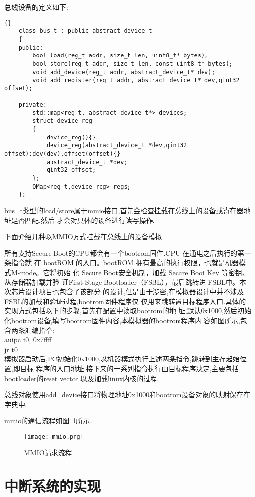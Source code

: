 总线设备的定义如下:
\begin{lstlisting}{}
    class bus_t : public abstract_device_t
    {
    public:
        bool load(reg_t addr, size_t len, uint8_t* bytes);
        bool store(reg_t addr, size_t len, const uint8_t* bytes);
        void add_device(reg_t addr, abstract_device_t* dev);
        void add_register(reg_t addr, abstract_device_t* dev,qint32 offset);
    
    private:
        std::map<reg_t, abstract_device_t*> devices;
        struct device_reg
        {
            device_reg(){}
            device_reg(abstract_device_t *dev,qint32 offset):dev(dev),offset(offset){}
            abstract_device_t *dev;
            qint32 offset;
        };
        QMap<reg_t,device_reg> regs;
    };     
\end{lstlisting}

bus\_t类型的load/store属于mmio接口,首先会检查挂载在总线上的设备或寄存器地址是否匹配,然后
才会对具体的设备进行读写操作.


下面介绍几种以MMIO方式挂载在总线上的设备模拟.


所有支持Secure Boot的CPU都会有一个bootrom固件.CPU 在通电之后执行的第一条指令就
在 bootROM 的入口。bootROM 拥有最高的执行权限，也就是机器模式M-mode。它将初始
化 Secure Boot安全机制，加载 Secure Boot Key 等密钥、从存储器加载并验
证First Stage Bootloader（FSBL），最后跳转进 FSBL中。本次芯片设计项目也包含了该部分
的设计,但是由于涉密,在模拟器设计中并不涉及FSBL的加载和验证过程,bootrom固件程序仅
仅用来跳转置目标程序入口.具体的实现方式包括以下的步骤,首先在配置中读取bootrom的地
址,默认0x1000,然后初始化bootrom设备,填写bootrom固件内容,本模拟器的bootrom程序内
容如图所示,包含两条汇编指令:\\
auipc	t0, 0x7ffff\\
jr 	t0\\
模拟器启动后,PC初始化0x1000,以机器模式执行上述两条指令,跳转到主存起始位置,即目标
程序的入口地址.接下来的一系列指令执行由目标程序决定,主要包括bootloader的reset vector
以及加载linux内核的过程.


总线对象使用add\_device接口将物理地址0x1000和bootrom设备对象的映射保存在字典中.


mmio的通信流程如图~\ref{fig:mmio}所示.
\begin{figure}[h]
    \centering
    \texttt{[image: mmio.png]}
    \caption{MMIO请求流程}
    \label{fig:mmio}
\end{figure}


\section{中断系统的实现}

